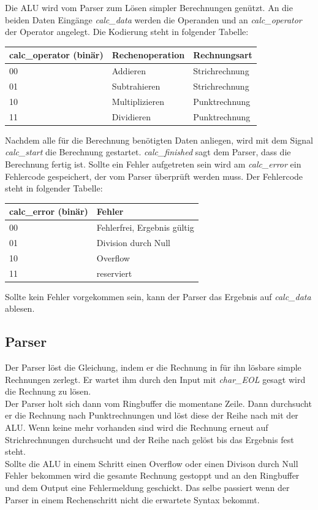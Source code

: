 Die ALU wird vom Parser zum Lösen simpler Berechnungen genützt. An die beiden Daten Eingänge \textit{calc\_data} werden die Operanden
und an \textit{calc\_operator} der Operator angelegt. Die Kodierung steht in folgender Tabelle:

\begin{center}
\begin{tabular}[!ht]{|l|l|l|}
\hline calc\_operator (binär) & Rechenoperation & Rechnungsart\\ 
	\hline
	00 & Addieren & Strichrechnung\\ 
	01 & Subtrahieren & Strichrechnung\\ 
	10 & Multiplizieren & Punktrechnung\\ 
	11 & Dividieren & Punktrechnung\\
 \hline
\end{tabular}
\end{center}

Nachdem alle für die Berechnung benötigten Daten anliegen, wird mit dem Signal \textit{calc\_start} die Berechnung gestartet. \textit{calc\_finished}
sagt dem Parser, dass die Berechnung fertig ist. Sollte ein Fehler aufgetreten sein wird am \textit{calc\_error} ein Fehlercode gespeichert, der vom
Parser überprüft werden muss. Der Fehlercode steht in folgender Tabelle:

\begin{center}
\begin{tabular}[!ht]{|l|l|}
\hline calc\_error (binär) & Fehler\\
	\hline
	00 & Fehlerfrei, Ergebnis gültig\\ 
	01 & Division durch Null\\ 
	10 & Overflow\\ 
	11 & reserviert\\
 \hline
\end{tabular}
\end{center}

Sollte kein Fehler vorgekommen sein, kann der Parser das Ergebnis auf \textit{calc\_data} ablesen. 

\subsection{Parser}
Der Parser löst die Gleichung, indem er die Rechnung in für ihn lösbare simple Rechnungen zerlegt.
Er wartet ihm durch den Input mit \textit{char\_EOL} gesagt wird die Rechnung zu lösen.\\
Der Parser holt sich dann vom Ringbuffer die momentane Zeile. Dann durchsucht er die Rechnung nach 
Punktrechnungen und löst diese der Reihe nach mit der ALU. Wenn keine mehr vorhanden sind wird
die Rechnung erneut auf Strichrechnungen durchsucht und der Reihe nach gelöst bis das Ergebnis 
fest steht.\\
Sollte die ALU in einem Schritt einen Overflow oder einen Divison durch Null Fehler bekommen wird 
die gesamte Rechnung gestoppt und an den Ringbuffer und dem Output eine Fehlermeldung geschickt.
Das selbe passiert wenn der Parser in einem Rechenschritt nicht die erwartete Syntax bekommt.\\

